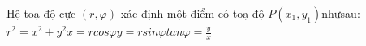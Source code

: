 \documentclass[preview]{standalone}
\begin{document}
\begin{center}
Hệ toạ độ cực $(r,\varphi)$ xác định một điểm có toạ độ $P(x_1, y_1)$nhưsau:$r^2=x^2+y^2$$x=rcos\varphi$$y=rsin\varphi$$tan\varphi=\frac{y}{x}$
\end{center}
\end{document}

